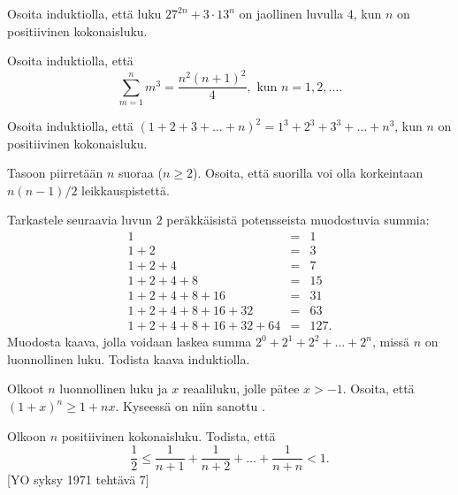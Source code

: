 \begin{kotitehtavasivu}
\begin{tehtava}
	Osoita induktiolla, että luku $27^{2n} + 3 \cdot 13^{n}$ on jaollinen luvulla $4$, kun $n$ on positiivinen kokonaisluku.
\end{tehtava}

\begin{tehtava}
	Osoita induktiolla, että
	\[
	\sum_{m=1}^n m^3= \frac{n^2(n+1)^2}{4}, \textrm{ kun } n=1, 2, \ldots.
	\]
\end{tehtava}

\begin{tehtava}
	Osoita induktiolla, että $(1 + 2 + 3 +\ldots + n)^2 = 1^3 + 2^3 + 3^3 + \ldots + n^3$, kun $n$ on positiivinen kokonaisluku.
\end{tehtava}

\begin{tehtava}
	Tasoon piirretään $n$ suoraa ($n\ge 2$). Osoita, että suorilla voi olla korkeintaan $n(n - 1)/2$ leikkauspistettä.
\end{tehtava}

\begin{tehtava}
	Tarkastele seuraavia luvun $2$ peräkkäisistä potensseista muodostuvia summia:
	\[
	\begin{array}{rcl}
	1 &=& 1\\
	1 + 2 &=& 3\\
	1 + 2 + 4 &=& 7\\
	1 + 2 + 4 + 8 &=& 15\\
	1 + 2 + 4 + 8 + 16 &=& 31\\
	1 + 2 + 4 + 8 + 16 + 32 &=& 63\\
	1 + 2 + 4 + 8 + 16 + 32 + 64 &=& 127.
	\end{array}
	\]
	Muodosta kaava, jolla voidaan laskea summa $2^0 + 2^1 + 2^2 + \ldots + 2^n$, missä $n$ on luonnollinen luku. Todista kaava induktiolla.
\end{tehtava}

\begin{tehtava}
	Olkoot $n$ luonnollinen luku ja $x$ reaaliluku, jolle pätee $x > -1$. Osoita, että $(1 + x)^n \ge 1 + nx$. Kyseessä on niin sanottu .
\end{tehtava}

\begin{tehtava}
	Olkoon $n$ positiivinen kokonaisluku. Todista, että
	\[
	\frac{1}{2}\le\frac{1}{n+1}+\frac{1}{n+2}+\ldots +\frac{1}{n+n} <1.
	\]
	[YO syksy 1971 tehtävä 7]
\end{tehtava}


\end{kotitehtavasivu}
